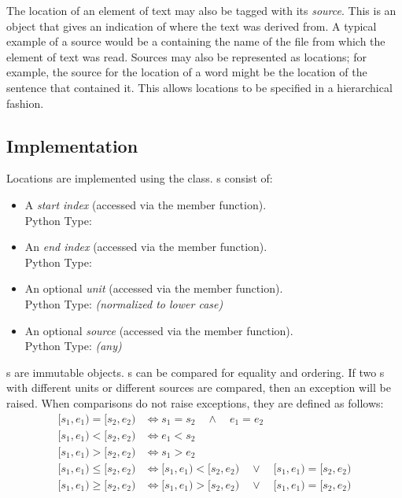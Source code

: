 \documentclass[11pt]{article}
\begin{document}
  The location of an element of text may also be tagged with its
  \emph{source}.  This is an object that gives an indication of where
  the text was derived from.  A typical example of a source would be a
   containing the name of the file from which the element
  of text was read.  Sources may also be represented as locations; for
  example, the source for the location of a word might be the location
  of the sentence that contained it.  This allows locations to be
  specified in a hierarchical fashion. %

  \subsection{Implementation}

  Locations are implemented using the  class.
  s consist of:

  \begin{itemize}

    \item A \emph{start index} (accessed via the  member
    function).  \\
    Python Type: 

    \item An \emph{end index} (accessed via the  member
    function).  \\
    Python Type: 

    \item An optional \emph{unit} (accessed via the 
    member function).  \\
    Python Type:  \emph{(normalized to lower case)}
    

    \item An optional \emph{source} (accessed via the 
    member function).  \\
    Python Type: \emph{(any)}

  \end{itemize}

  \noindent
  s are immutable objects.  s can be
  compared for equality and ordering.  If two s with
  different units or different sources are compared, then an exception
  will be raised.  When  comparisons do not raise
  exceptions, they are defined as follows:
  \begin{align*}
     [s_1,e_1) = [s_2,e_2) &\iff s_1=s_2 \quad \land \quad e_1=e_2 \\
     [s_1,e_1) < [s_2,e_2) &\iff e_1 < s_2 \\
     [s_1,e_1) > [s_2,e_2) &\iff s_1 > e_2 \\
     [s_1,e_1) \leq [s_2,e_2) &\iff [s_1,e_1) < [s_2,e_2) \quad \lor \quad
                             [s_1,e_1) = [s_2,e_2) \\
     [s_1,e_1) \geq [s_2,e_2) &\iff [s_1,e_1) > [s_2,e_2) \quad \lor \quad
                             [s_1,e_1) = [s_2,e_2) 
  \end{align*}
\end{document}
